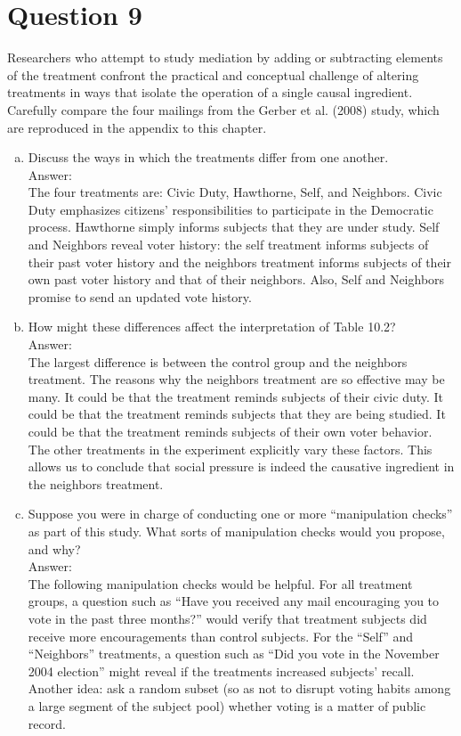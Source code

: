 \documentclass[11pt,notitlepage]{article}\usepackage[]{graphicx}\usepackage[]{color}
\begin{document}
\section*{Question 9}
Researchers who attempt to study mediation by adding or subtracting elements of the treatment confront the practical and conceptual challenge of altering treatments in ways that isolate the operation of a single causal ingredient. Carefully compare the four mailings from the Gerber et al. (2008) study, which are reproduced in the appendix to this chapter.

\begin{enumerate}[a)]
\item Discuss the ways in which the treatments differ from one another. \\
Answer:\\
The four treatments are: Civic Duty, Hawthorne, Self, and Neighbors.  Civic Duty emphasizes citizens' responsibilities to participate in the Democratic process. Hawthorne simply informs subjects that they are under study.  Self and Neighbors reveal voter history: the self treatment informs subjects of their past voter history and the neighbors treatment informs subjects of their own past voter history and that of their neighbors. Also, Self and Neighbors promise to send an updated vote history.

\item How might these differences affect the interpretation of Table 10.2?\\
Answer:\\
The largest difference is between the control group and the neighbors treatment. The reasons why the neighbors treatment are so effective may be many. It could be that the treatment reminds subjects of their civic duty.  It could be that the treatment reminds subjects that they are being studied.  It could be that the treatment reminds subjects of their own voter behavior. The other treatments in the experiment explicitly vary these factors. This allows us to conclude that social pressure is indeed the causative ingredient in the neighbors treatment.

\item Suppose you were in charge of conducting one or more ``manipulation checks'' as part of this study. What sorts of manipulation checks would you propose, and why?\\
Answer:\\
The following manipulation checks would be helpful. For all treatment groups, a question such as ``Have you received any mail encouraging you to vote in the past three months?'' would verify that treatment subjects did receive more encouragements than control subjects. For the ``Self'' and ``Neighbors'' treatments, a question such as ``Did you vote in the November 2004 election'' might reveal if the treatments increased subjects' recall.  Another idea: ask a random subset (so as not to disrupt voting habits among a large segment of the subject pool) whether voting is a matter of public record.
\end{enumerate}
\end{document}
